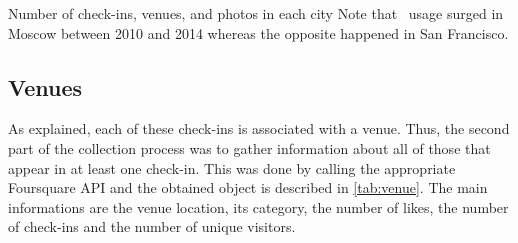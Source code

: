 \begin{table}[ht]
\caption[Dataset number]{Number of check-ins, venues, and photos in each city
Note that \fs\ usage surged in Moscow between 2010 and 2014 whereas the
opposite happened in San Francisco.\label{tab:dataset}}
\end{table}

\subsection{Venues}

As explained, each of these check-ins is associated with a venue. Thus, the second part of
the collection process was to gather information about all of those
 that appear in at least one check-in. This was done by calling the
appropriate Foursquare API and the obtained object is described in
\autoref{tab:venue}. The main informations are the venue location, its category,
the number of likes, the number of check-ins and the number of unique visitors.
